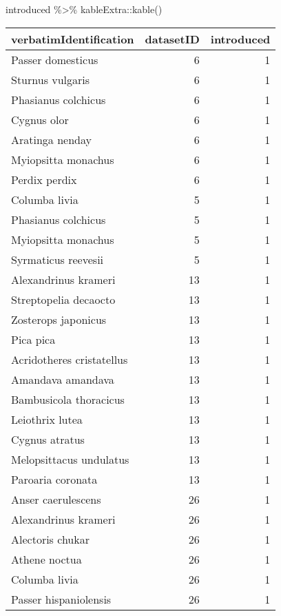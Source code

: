 \documentclass[
  letterpaper,
  DIV=11,
  numbers=noendperiod]{scrreprt}
\newenvironment{Shaded}{\begin{snugshade}}{\end{snugshade}}
\newcommand{\FunctionTok}[1]{\textcolor[rgb]{0.28,0.35,0.67}{#1}}
\newcommand{\NormalTok}[1]{\textcolor[rgb]{0.00,0.23,0.31}{#1}}
\newcommand{\SpecialCharTok}[1]{\textcolor[rgb]{0.37,0.37,0.37}{#1}}
\begin{document}
\begin{Shaded}
\begin{Highlighting}[]
\NormalTok{introduced }\SpecialCharTok{\%\textgreater{}\%}
\NormalTok{  kableExtra}\SpecialCharTok{::}\FunctionTok{kable}\NormalTok{()}
\end{Highlighting}
\end{Shaded}

\begin{longtable}[]{@{}lrr@{}}
\toprule\noalign{}
verbatimIdentification & datasetID & introduced \\
\midrule\noalign{}
\endhead
\bottomrule\noalign{}
\endlastfoot
Passer domesticus & 6 & 1 \\
Sturnus vulgaris & 6 & 1 \\
Phasianus colchicus & 6 & 1 \\
Cygnus olor & 6 & 1 \\
Aratinga nenday & 6 & 1 \\
Myiopsitta monachus & 6 & 1 \\
Perdix perdix & 6 & 1 \\
Columba livia & 5 & 1 \\
Phasianus colchicus & 5 & 1 \\
Myiopsitta monachus & 5 & 1 \\
Syrmaticus reevesii & 5 & 1 \\
Alexandrinus krameri & 13 & 1 \\
Streptopelia decaocto & 13 & 1 \\
Zosterops japonicus & 13 & 1 \\
Pica pica & 13 & 1 \\
Acridotheres cristatellus & 13 & 1 \\
Amandava amandava & 13 & 1 \\
Bambusicola thoracicus & 13 & 1 \\
Leiothrix lutea & 13 & 1 \\
Cygnus atratus & 13 & 1 \\
Melopsittacus undulatus & 13 & 1 \\
Paroaria coronata & 13 & 1 \\
Anser caerulescens & 26 & 1 \\
Alexandrinus krameri & 26 & 1 \\
Alectoris chukar & 26 & 1 \\
Athene noctua & 26 & 1 \\
Columba livia & 26 & 1 \\
Passer hispaniolensis & 26 & 1 \\

\end{longtable}
\end{document}
